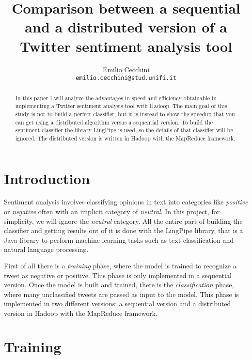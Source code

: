 \documentclass[10pt,twocolumn,letterpaper]{article}
\begin{document}
\title{Comparison between a sequential and a distributed version of a Twitter sentiment analysis tool}

\author{
    Emilio Cecchini \\
    {\tt\small emilio.cecchini@stud.unifi.it}
}

\maketitle
\thispagestyle{empty}

\begin{abstract}
In this paper I will analyze the advantages in speed and efficiency obtainable in implementing a Twitter sentiment analysis tool with Hadoop. The main goal of this study is not to build a perfect classifier, but it is instead to show the speedup that you can get using a distributed algorithm versus a sequential version. To build the sentiment classifier the library LingPipe is used, so the details of that classifier will be ignored. The distributed version is written in Hadoop with the MapReduce framework.
\end{abstract}

\section{Introduction}

Sentiment analysis involves classifying opinions in text into categories like \textit{positive} or \textit{negative} often with an implicit category of \textit{neutral}. In this project, for simplicity, we will ignore the \textit{neutral} category. All the entire part of building the classifier and getting results out of it is done with the LingPipe library, that is a Java library to perform machine learning tasks such as text classification and natural language processing.

First of all there is a \textit{training} phase, where the model is trained to recognize a tweet as negative or positive. This phase is only implemented in a sequential version. Once the model is built and trained, there is the \textit{classification} phase, where many unclassified tweets are passed as input to the model. This phase is implemented in two different versions: a sequential version and a distributed version in Hadoop with the MapReduce framework.

\section{Training}
\end{document}
